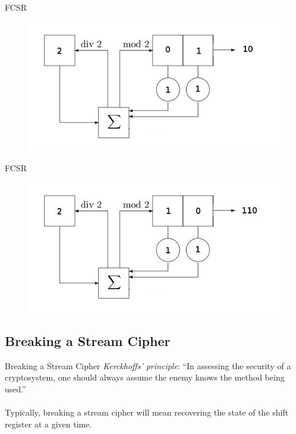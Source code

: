 \documentclass{beamer}
\begin{document}
\begin{frame}{FCSR}
  \begin{figure}[h!]
    \centering
    \includegraphics[totalheight=0.5\textheight]{small-fcsr-3.jpg}
  \end{figure}
\end{frame}
\begin{frame}{FCSR}
  \begin{figure}[h!]
    \centering
    \includegraphics[totalheight=0.5\textheight]{small-fcsr-4.jpg}
  \end{figure}
\end{frame}

\subsection{Breaking a Stream Cipher}
\begin{frame}{Breaking a Stream Cipher}
  \textit{Kerckhoffs' principle}: ``In assessing the security of a
  cryptosystem, one should always assume the enemy knows the method being
  used.''\\
  \ \\
  Typically, breaking a stream cipher will mean recovering the state of
  the shift register at a given time.
\end{frame}
\end{document}
